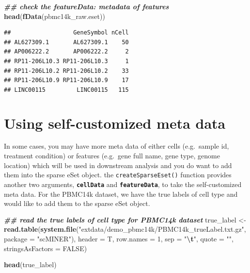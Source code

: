 \documentclass[
  12pt,
]{book}
\newenvironment{Shaded}{\begin{snugshade}}{\end{snugshade}}
\newcommand{\AttributeTok}[1]{\textcolor[rgb]{0.13,0.29,0.53}{#1}}
\newcommand{\ConstantTok}[1]{\textcolor[rgb]{0.56,0.35,0.01}{#1}}
\newcommand{\DecValTok}[1]{\textcolor[rgb]{0.00,0.00,0.81}{#1}}
\newcommand{\DocumentationTok}[1]{\textcolor[rgb]{0.56,0.35,0.01}{\textbf{\textit{#1}}}}
\newcommand{\FunctionTok}[1]{\textcolor[rgb]{0.13,0.29,0.53}{\textbf{#1}}}
\newcommand{\NormalTok}[1]{#1}
\newcommand{\OtherTok}[1]{\textcolor[rgb]{0.56,0.35,0.01}{#1}}
\newcommand{\SpecialCharTok}[1]{\textcolor[rgb]{0.81,0.36,0.00}{\textbf{#1}}}
\newcommand{\StringTok}[1]{\textcolor[rgb]{0.31,0.60,0.02}{#1}}
\begin{document}
\begin{Shaded}
\begin{Highlighting}[]
\DocumentationTok{\#\# check the featureData: metadata of features}
\FunctionTok{head}\NormalTok{(}\FunctionTok{fData}\NormalTok{(pbmc14k\_raw.eset))}
\end{Highlighting}
\end{Shaded}

\begin{verbatim}
##                  GeneSymbol nCell
## AL627309.1       AL627309.1    50
## AP006222.2       AP006222.2     2
## RP11-206L10.3 RP11-206L10.3     1
## RP11-206L10.2 RP11-206L10.2    33
## RP11-206L10.9 RP11-206L10.9    17
## LINC00115         LINC00115   115
\end{verbatim}

\section{Using self-customized meta data}\label{using-self-customized-meta-data}

In some cases, you may have more meta data of either cells (e.g.~sample id, treatment condition) or features (e.g.~gene full name, gene type, genome location) which will be used in downstream analysis and you do want to add them into the sparse eSet object. the \texttt{createSparseEset()} function provides another two arguments, \textbf{\texttt{cellData}} and \textbf{\texttt{featureData}}, to take the self-customized meta data. For the PBMC14k dataset, we have the true labels of cell type and would like to add them to the sparse eSet object.

\begin{Shaded}
\begin{Highlighting}[]
\DocumentationTok{\#\# read the true labels of cell type for PBMC14k dataset}
\NormalTok{true\_label }\OtherTok{\textless{}{-}} \FunctionTok{read.table}\NormalTok{(}\FunctionTok{system.file}\NormalTok{(}\StringTok{"extdata/demo\_pbmc14k/PBMC14k\_trueLabel.txt.gz"}\NormalTok{, }\AttributeTok{package =} \StringTok{"scMINER"}\NormalTok{), }\AttributeTok{header =}\NormalTok{ T, }\AttributeTok{row.names =} \DecValTok{1}\NormalTok{, }\AttributeTok{sep =} \StringTok{"}\SpecialCharTok{\textbackslash{}t}\StringTok{"}\NormalTok{, }\AttributeTok{quote =} \StringTok{""}\NormalTok{, }\AttributeTok{stringsAsFactors =} \ConstantTok{FALSE}\NormalTok{)}

\FunctionTok{head}\NormalTok{(true\_label)}
\end{Highlighting}
\end{Shaded}
\end{document}
